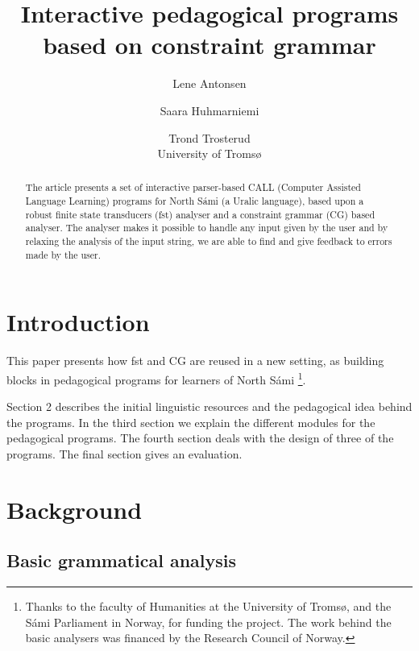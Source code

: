 \documentclass[11pt]{article}
\begin{document}
\title{Interactive pedagogical programs based on constraint grammar}

\author{Lene Antonsen  \and
              Saara Huhmarniemi \and Trond Trosterud \\ University of Tromsø}

 
\maketitle

\begin{abstract}
The article presents a set of interactive parser-based CALL (Computer Assisted Language Learning) programs for North Sámi (a Uralic language), based upon a robust finite state transducers (fst) analyser and a constraint grammar (CG) based analyser. The analyser makes it possible to handle any input given by the user %
and by relaxing the analysis of the input string, we are able to find and give feedback to errors made by the user. 
\end{abstract}

\section{Introduction}
This paper presents how fst and CG are reused in a new setting, as building blocks in pedagogical programs for learners of North Sámi \footnote{Thanks to the faculty of Humanities at the University of Tromsø, and the Sámi Parliament in Norway, for funding the project. The work behind the basic analysers was financed by the Research Council of Norway.}. 

Section 2 describes the initial linguistic resources and the pedagogical idea behind the programs. In the third section we explain the different modules for the pedagogical programs. The fourth section deals with the design of three of the programs. The final section gives an evaluation.


\section{Background}

\subsection{Basic grammatical analysis}
\end{document}

